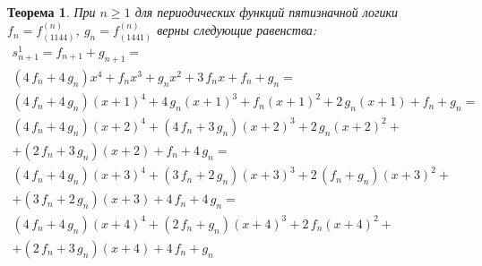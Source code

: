 \documentclass[bibliography=totoc, a4paper, 14pt]{extarticle}
\newtheorem{myth}{Теорема}
\begin{document}
\begin{myth} При $n \geqslant 1 $ для периодических функций пятизначной логики $f_n = f^{\left(n\right)}_{\left(1144\right)}$,
$g_n = f^{\left(n\right)}_{\left(1441\right)}$ верны следующие равенства:
$$\begin{array}{l}
s_{n+1}^1 = f_{n+1} + g_{n+1}=\\
 {\left(4 \, f_{n} + 4 \, g_{n}\right)} x^{4} + f_{n} x^{3} + g_{n} x^{2} + 3 \, f_{n} x + f_{n} + g_{n} =\\
 {\left(4 \, f_{n} + 4 \, g_{n}\right)} {\left(x + 1\right)}^{4} + 4 \, g_{n} {\left(x + 1\right)}^{3} + f_{n} {\left(x + 1\right)}^{2} + 2 \, g_{n} {\left(x + 1\right)} + f_{n} + g_{n} =\\
 {\left(4 \, f_{n} + 4 \, g_{n}\right)} {\left(x + 2\right)}^{4} + {\left(4 \, f_{n} + 3 \, g_{n}\right)} {\left(x + 2\right)}^{3} + 2 \, g_{n} {\left(x + 2\right)}^{2} +\\
 + {\left(2 \, f_{n} + 3 \, g_{n}\right)} {\left(x + 2\right)} + f_{n} + 4 \, g_{n} =\\
 {\left(4 \, f_{n} + 4 \, g_{n}\right)} {\left(x + 3\right)}^{4} + {\left(3 \, f_{n} + 2 \, g_{n}\right)} {\left(x + 3\right)}^{3} + 2 \, {\left(f_{n} + g_{n}\right)} {\left(x + 3\right)}^{2} + \\
 + {\left(3 \, f_{n} + 2 \, g_{n}\right)} {\left(x + 3\right)} + 4 \, f_{n} + 4 \, g_{n} =\\
 {\left(4 \, f_{n} + 4 \, g_{n}\right)} {\left(x + 4\right)}^{4} + {\left(2 \, f_{n} + g_{n}\right)} {\left(x + 4\right)}^{3} + 2 \, f_{n} {\left(x + 4\right)}^{2} +\\
 + {\left(2 \, f_{n} + 3 \, g_{n}\right)} {\left(x + 4\right)} + 4 \, f_{n} + g_{n}\\
 \end{array}$$
\end{myth}
\end{document}
